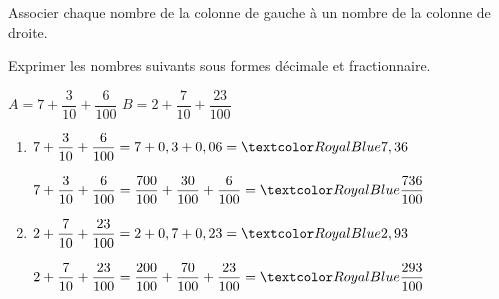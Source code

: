 \begin{Maquette}[Fiche,CorrigeFin,Colonnes=2]{}

   \begin{multicols}{2}

      \begin{exercice}[SLF] %
         Associer chaque nombre de la colonne de gauche à un nombre de la colonne de droite. \par
      \end{exercice} 

      \begin{Solution}
      \end{Solution}
    
        
      \begin{exercice} %
         Exprimer les nombres suivants sous formes décimale et fractionnaire. \par \smallskip
         $A =7+\dfrac{3}{10}+\dfrac{6}{100}$ \hfill $B =2+\dfrac{7}{10}+\dfrac{23}{100}$
      \end{exercice}

      \begin{Solution}
         \begin{enumerate}
            \item $7+\dfrac{3}{10}+\dfrac{6}{100} = 7+0,3+0,06 =\cor{7,36}$ \par \smallskip
               $7+\dfrac{3}{10}+\dfrac{6}{100} =\dfrac{700}{100}+\dfrac{30}{100}+\dfrac{6}{100} =\cor{\dfrac{736}{100}}$ \smallskip
            \item $2+\dfrac{7}{10}+\dfrac{23}{100} = 2+0,7+0,23 =\cor{2,93}$ \par \smallskip
               $2+\dfrac{7}{10}+\dfrac{23}{100} =\dfrac{200}{100}+\dfrac{70}{100}+\dfrac{23}{100} =\cor{\dfrac{293}{100}}$
         \end{enumerate}
      \end{Solution}
      

\end{multicols}
\end{Maquette}
